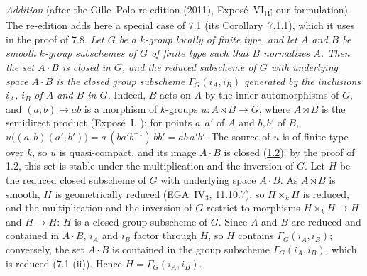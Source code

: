 
\medskip\noindent
\emph{Addition} (after the Gille--Polo re-edition (2011), Exposé~VI\textsubscript{B}; our
formulation). The re-edition adds here a special case of 7.1 (its Corollary~7.1.1), which it uses in
the proof of 7.8. \emph{Let \(G\) be a \(k\)-group locally of finite type, and let \(A\) and \(B\) be
smooth \(k\)-group subschemes of \(G\) of finite type such that \(B\) normalizes \(A\). Then the set
\(A\cdot B\) is closed in \(G\), and the reduced subscheme of \(G\) with underlying space \(A\cdot B\)
is the closed group subscheme \(\Gamma_G(i_A,i_B)\) generated by the inclusions \(i_A\), \(i_B\) of
\(A\) and \(B\) in \(G\).} Indeed, \(B\) acts on \(A\) by the inner automorphisms of \(G\), and
\((a,b)\mapsto ab\) is a morphism of \(k\)-groups \(u\colon A\rtimes B\to G\), where \(A\rtimes B\)
is the semidirect product (Exposé~I, ): for points
\(a,a'\) of \(A\) and \(b,b'\) of \(B\), \(u\bigl((a,b)(a',b')\bigr)=a\,(ba'b^{-1})\,bb'=ab\,a'b'\). The
source of \(u\) is of finite type over \(k\), so \(u\) is quasi-compact, and its image \(A\cdot B\) is
closed (\hyperref[prop:sga3-VIB-1.2]{1.2}); by the proof of 1.2, this set is stable under the
multiplication and the inversion of \(G\). Let \(H\) be the reduced closed subscheme of \(G\) with
underlying space \(A\cdot B\). As \(A\rtimes B\) is smooth, \(H\) is geometrically reduced
(EGA~IV\(_3\), 11.10.7), so \(H\times_kH\) is reduced, and the multiplication and the inversion of \(G\)
restrict to morphisms \(H\times_kH\to H\) and \(H\to H\): \(H\) is a closed group subscheme of \(G\).
Since \(A\) and \(B\) are reduced and contained in \(A\cdot B\), \(i_A\) and \(i_B\) factor through
\(H\), so \(H\) contains \(\Gamma_G(i_A,i_B)\); conversely, the set \(A\cdot B\) is contained in the
group subscheme \(\Gamma_G(i_A,i_B)\), which is reduced (7.1 (ii)). Hence \(H=\Gamma_G(i_A,i_B)\).

